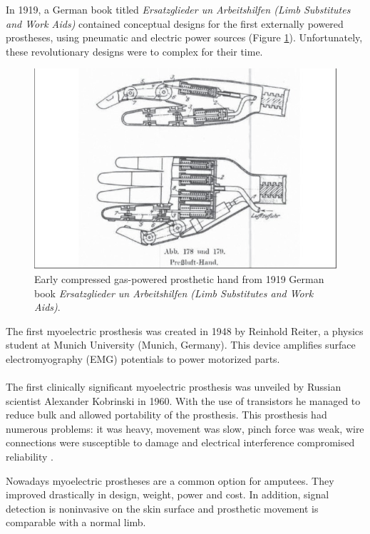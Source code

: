 \documentclass[11pt, a4paper]{article}
\begin{document}
\noindent
In 1919, a German book titled \textit{Ersatzglieder un Arbeitshilfen (Limb Substitutes and Work Aids)} contained conceptual designs for the first externally powered prostheses, using pneumatic and electric power sources (Figure \ref{fig:PrebluftHand}).
Unfortunately, these revolutionary designs were to complex for their time.
\\
\begin{figure}[h]
    \centering
    \includegraphics[scale=0.4]{PrebluftHand_1.jpg}
    \caption{Early compressed gas-powered prosthetic hand from 1919 German book \textit{Ersatzglieder un Arbeitshilfen (Limb Substitutes and Work Aids)}.}
    \label{fig:PrebluftHand}
\end{figure} 

\noindent
The first myoelectric prosthesis was created in 1948 by Reinhold Reiter, a physics student at Munich University (Munich, Germany).
This device amplifies surface electromyography (EMG) potentials to power motorized parts.
\\ \\
The first clinically significant myoelectric prosthesis was unveiled by Russian scientist Alexander Kobrinski in 1960.
With the use of transistors he managed to reduce bulk and allowed portability of the prosthesis.
This prosthesis had numerous problems: it was heavy, movement was slow, pinch force was weak, wire connections were susceptible to damage and electrical interference compromised reliability \cite{myoelectric}.  

\newpage

\noindent
Nowadays myoelectric prostheses are a common option for amputees. 
They improved drastically in design, weight, power and cost.
In addition, signal detection is noninvasive on the skin surface and prosthetic movement is comparable with a normal limb.
\end{document}
